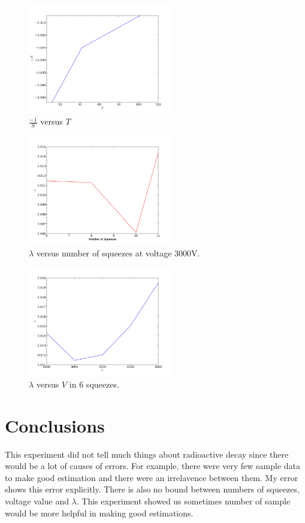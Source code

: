 \documentclass[aps,twocolumn,secnumarabic,nobalancelastpage,amsmath,amssymb,
nofootinbib]{revtex4}
\begin{document}
\begin{figure}[htbp]
\includegraphics[width=2.5in]{plot2}
\caption{$\frac{-1}{S}$ versus $T$}
\label{fig:schematic}
\end{figure}

\begin{figure}[htbp]
\includegraphics[width=2.5in]{plot3}
\caption{$\lambda$ versus number of squeezes at voltage 3000V.}
\label{fig:schematic}
\end{figure}

\begin{figure}[htbp]
\includegraphics[width=2.5in]{plot4}
\caption{$\lambda$ versus $V$ in 6 squeezes.}
\label{fig:schematic}
\end{figure}

\section{Conclusions}
This experiment did not tell much things about radioactive decay since there would be a lot of causes of errors. For example, there were very few sample data to make good estimation and there were an irrelavence between them. My error shows this error explicitly. There is also no bound between numbers of squeezes, voltage value and $\lambda$.
This experiment showed us sometimes number of sample would be more helpful in making good estimations.
\end{document}
